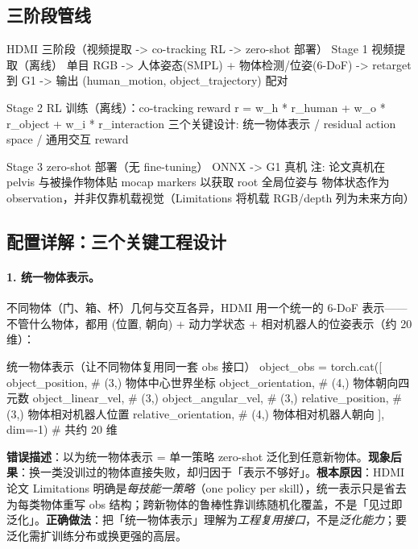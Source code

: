 \subsection{三阶段管线}
\label{sec:rlmc-mm-hdmi-pipeline}

\begin{codebox}{HDMI 三阶段（视频提取 -> co-tracking RL -> zero-shot 部署）}
Stage 1 视频提取（离线）
  单目 RGB -> 人体姿态(SMPL) + 物体检测/位姿(6-DoF) -> retarget 到 G1
  -> 输出 (human_motion, object_trajectory) 配对

Stage 2 RL 训练（离线）：co-tracking reward
  r = w_h * r_human + w_o * r_object + w_i * r_interaction
  三个关键设计: 统一物体表示 / residual action space / 通用交互 reward

Stage 3 zero-shot 部署（无 fine-tuning）
  ONNX -> G1 真机
  注: 论文真机在 pelvis 与被操作物体贴 mocap markers 以获取 root 全局位姿与
      物体状态作为 observation，并非仅靠机载视觉（Limitations 将机载 RGB/depth 列为未来方向）
\end{codebox}

\subsection{配置详解：三个关键工程设计}
\label{sec:rlmc-mm-hdmi-design}

\paragraph{1. 统一物体表示。}不同物体（门、箱、杯）几何与交互各异，HDMI 用一个统一的 6-DoF 表示——不管什么物体，都用 (位置, 朝向) + 动力学状态 + 相对机器人的位姿表示（约 20 维）：

\begin{codebox}[Python]{统一物体表示（让不同物体复用同一套 obs 接口）}
object_obs = torch.cat([
    object_position,       # (3,) 物体中心世界坐标
    object_orientation,    # (4,) 物体朝向四元数
    object_linear_vel,     # (3,)
    object_angular_vel,    # (3,)
    relative_position,     # (3,) 物体相对机器人位置
    relative_orientation,  # (4,) 物体相对机器人朝向
], dim=-1)                 # 共约 20 维
\end{codebox}

\begin{pitfall}
\textbf{错误描述}：以为统一物体表示 = 单一策略 zero-shot 泛化到任意新物体。\textbf{现象后果}：换一类没训过的物体直接失败，却归因于「表示不够好」。\textbf{根本原因}：HDMI 论文 Limitations 明确是\emph{每技能一策略}（one policy per skill），统一表示只是省去为每类物体重写 obs 结构；跨新物体的鲁棒性靠训练随机化覆盖，不是「见过即泛化」。\textbf{正确做法}：把「统一物体表示」理解为\emph{工程复用接口}，不是\emph{泛化能力}；要泛化需扩训练分布或换更强的高层。
\end{pitfall}

